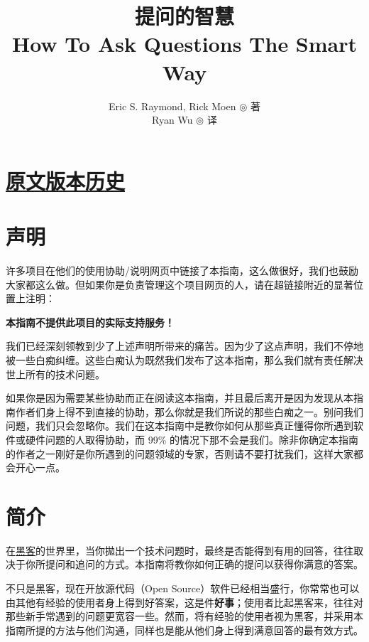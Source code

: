 \documentclass[titlepage]{article}
\title{\textbf{提问的智慧\\\normalsize How To Ask Questions The Smart Way}}
\author{Eric S. Raymond, Rick Moen $ \circledcirc $ 著\\Ryan Wu $ \circledcirc $ 译}
\date{二〇一五年\\[10em]\parbox{\linewidth}{Copyright © 2001,2006,2014 Eric S. Raymond, Rick Moen\\
		本指南英文版版权为 Eric S. Raymond, Rick Moen 所有。\\
		原文网址：\url{http://www.catb.org/~esr/faqs/smart-questions.html}\\
		Copyleft 2001 by D.H.Grand(nOBODY/Ginux), 2010 by Gasolin, 2015 by Ryan Wu\\	
		本中文指南是基于原文 3.10 版以及 2010 年由
		\href{https://github.com/gasolin}{Gasolin} 所翻译版本的最新翻译；\\	
		协助指出翻译问题，\textbf{请\href{https://github.com/ryanhanwu/smartquestions/issues/new}{发
				Issue}，或直接\href{https://github.com/ryanhanwu/smartquestions/compare/}{发Pull Request} 给我}。\\	
		本文另有\href{https://github.com/ryanhanwu/How-To-Ask-Questions-The-Smart-Way/blob/master/README.md}{繁體中文版}。}}
\begin{document}
\maketitle

\tableofcontents\newpage

\section{\texorpdfstring{\href{https://github.com/ryanhanwu/smartquestions/blob/master/history.md}{原文版本历史}}{原文版本历史}}\label{ux539fux6587ux7248ux672cux5386ux53f2}

\hypertarget{ux58f0ux660e}{\section{声明}\label{ux58f0ux660e}}

许多项目在他们的使用协助/说明网页中链接了本指南，这么做很好，我们也鼓励大家都这么做。但如果你是负责管理这个项目网页的人，请在超链接附近的显著位置上注明：

\textbf{本指南不提供此项目的实际支持服务！}

我们已经深刻领教到少了上述声明所带来的痛苦。因为少了这点声明，我们不停地被一些白痴纠缠。这些白痴认为既然我们发布了这本指南，那么我们就有责任解决世上所有的技术问题。

如果你是因为需要某些协助而正在阅读这本指南，并且最后离开是因为发现从本指南作者们身上得不到直接的协助，那么你就是我们所说的那些白痴之一。别问我们问题，我们只会忽略你。我们在这本指南中是教你如何从那些真正懂得你所遇到软件或硬件问题的人取得协助，而
99\%
的情况下那不会是我们。除非你确定本指南的作者之一刚好是你所遇到的问题领域的专家，否则请不要打扰我们，这样大家都会开心一点。

\hypertarget{ux7b80ux4ecb}{\section{简介}\label{ux7b80ux4ecb}}

在\href{http://www.catb.org/~esr/faqs/hacker-howto.html}{黑客}的世界里，当你拋出一个技术问题时，最终是否能得到有用的回答，往往取决于你所提问和追问的方式。本指南将教你如何正确的提问以获得你满意的答案。

不只是黑客，现在开放源代码（Open
Source）软件已经相当盛行，你常常也可以由其他有经验的使用者身上得到好答案，这是件\textbf{好事}；使用者比起黑客来，往往对那些新手常遇到的问题更宽容一些。然而，将有经验的使用者视为黑客，并采用本指南所提的方法与他们沟通，同样也是能从他们身上得到满意回答的最有效方式。
\end{document}
